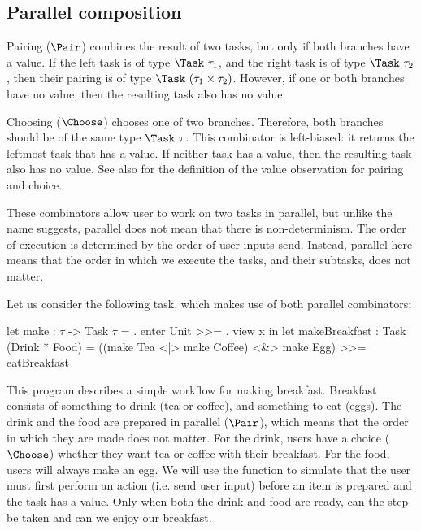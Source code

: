 \subsection{Parallel composition}

Pairing ($\Pair$) combines the result of two tasks, but only if both branches have a value.
If the left task is of type $\Task\ \tau_1$, and the right task is of type $\Task\ \tau_2$, then their pairing is of type $\Task\ (\tau_1 \times \tau_2)$.
However, if one or both branches have no value, then the resulting task also has no value.

Choosing ($\Choose$) chooses one of two branches.
Therefore, both branches should be of the same type $\Task\ \tau$.
This combinator is left-biased: it returns the leftmost task that has a value.
If neither task has a value, then the resulting task also has no value.
See also  for the definition of the value observation for pairing and choice.

These combinators allow user to work on two tasks in parallel, but unlike the name suggests, parallel does not mean that there is non-determinism.
The order of execution is determined by the order of user inputs send.
Instead, parallel here means that the order in which we execute the tasks, and their subtasks, does not matter.

  Let us consider the following task, which makes use of both parallel combinators:
  \begin{TASK}
    let make : $\tau$ -> Task $\tau$ = \x. enter Unit >>= \y. view x in
    let makeBreakfast : Task (Drink * Food) =
      ((make Tea <|> make Coffee) <&> make Egg) >>= eatBreakfast
  \end{TASK}
  This program describes a simple workflow for making breakfast.
  Breakfast consists of something to drink (tea or coffee), and something to eat (eggs).
  The drink and the food are prepared in parallel ($\Pair$), which means that the order in which they are made does not matter.
  For the drink, users have a choice ($\Choose$) whether they want tea or coffee with their breakfast.
  For the food, users will always make an egg.
  We will use the function  to simulate that the user must first perform an action (i.e. send user input) before an item is prepared and the task has a value.
  Only when both the drink and food are ready, can the step be taken and can we enjoy our breakfast.
\stopexample


